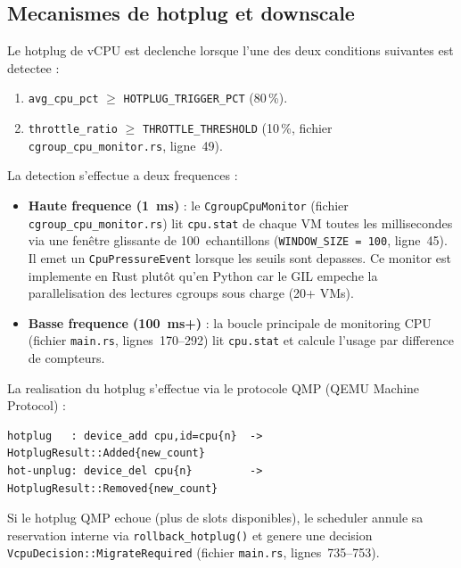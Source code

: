 \subsection{Mecanismes de hotplug et downscale}
\label{subsec:hotplug-downscale}

Le hotplug de vCPU est declenche lorsque l'une des deux conditions suivantes est detectee :

\begin{enumerate}
    \item \texttt{avg\_cpu\_pct} $\geq$ \texttt{HOTPLUG\_TRIGGER\_PCT} (80\,\%).
    \item \texttt{throttle\_ratio} $\geq$ \texttt{THROTTLE\_THRESHOLD} (10\,\%, fichier \texttt{cgroup\_cpu\_monitor.rs}, ligne~49).
\end{enumerate}

La detection s'effectue a deux frequences :

\begin{itemize}
    \item \textbf{Haute frequence (1~ms)} : le \texttt{CgroupCpuMonitor} (fichier \texttt{cgroup\_cpu\_monitor.rs}) lit \texttt{cpu.stat} de chaque VM toutes les millisecondes via une fen\^etre glissante de 100~echantillons (\texttt{WINDOW\_SIZE = 100}, ligne~45). Il emet un \texttt{CpuPressureEvent} lorsque les seuils sont depasses. Ce monitor est implemente en Rust plut\^ot qu'en Python car le GIL empeche la parallelisation des lectures cgroups sous charge (20+ VMs).
    \item \textbf{Basse frequence (100~ms+)} : la boucle principale de monitoring CPU (fichier \texttt{main.rs}, lignes~170--292) lit \texttt{cpu.stat} et calcule l'usage par difference de compteurs.
\end{itemize}

La realisation du hotplug s'effectue via le protocole QMP (QEMU Machine Protocol) :

\begin{verbatim}
hotplug   : device_add cpu,id=cpu{n}  -> HotplugResult::Added{new_count}
hot-unplug: device_del cpu{n}         -> HotplugResult::Removed{new_count}
\end{verbatim}

Si le hotplug QMP echoue (plus de slots disponibles), le scheduler annule sa reservation interne via \texttt{rollback\_hotplug()} et genere une decision \texttt{VcpuDecision::MigrateRequired} (fichier \texttt{main.rs}, lignes~735--753).


